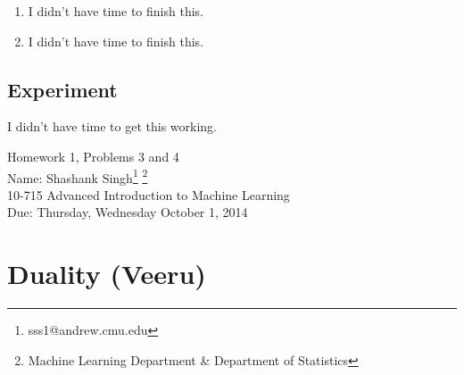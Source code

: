 \documentclass[11pt]{article}
\makeatletter
\newcommand{\myname}{Shashank Singh\footnote{sss1@andrew.cmu.edu}
        \footnote{Machine Learning Department \& Department of Statistics}}
\newcommand{\myclass}{10-715 Advanced Introduction to Machine Learning}
\newcommand{\myhwnum}{1}
\newcommand{\duedate}{Thursday, Wednesday October 1, 2014}
\renewcommand{\qed}{\quad \ensuremath{\blacksquare}}
\newcommand{\inv}{^{-1}}
\newcommand{\R}{\mathbb{R}} %
\makeatother
\begin{document}
\begin{enumerate}
\[            \dots,
            \psi(\alpha_r^{(V)}) - \psi(\alpha_r^{(V)} + x_i^{(V)})\right),
\]
\[c_{\alpha_r}
    = \sum_{i : y_i = r}^n
        \psi^{(1)}\left( \sum_{j = 1}^V \alpha_r^{(j)} + x_i^{(j)} \right)
        - \psi^{(1)}\left( \sum_{j = 1}^V \alpha_r^{(j)} \right),
\]
and $1_V \in \R^V$ denotes the $V$ dimensional column vector of all ones. Since
$D_{\alpha_r}$ is diagonal, $D_{\alpha_r}$ can be represented and inverted in
$\tilde O(V)$ time and space. Thus, we can use the Sherman-Morrison inversion
formula:
\[\left[H\ell_{\alpha_r}(\alpha_r) \right]\inv
    = \left( D_{\alpha_r} + c_{\alpha_r}1_V1_V^T \right)\inv
    = D_{\alpha_r}\inv
        - \frac{D_{\alpha_r}\inv c_{\alpha_r}1_V1_V^TD_{\alpha_r}\inv}
               {1 + c_{\alpha_r}1_V^TD_{\alpha_r}\inv1_V}.
\]
Hence, since the Newton update is
\[\hat\alpha_r \to
    \hat\alpha_r -
    \left[H\ell_{\alpha_r}(\hat\alpha_r) \right]\inv
    \nabla\ell_{\alpha_r}(\hat\alpha_r)
    = \hat\alpha_r -
    \left( D_{\hat\alpha_r}\inv
    - \frac{D_{\hat\alpha_r}\inv c_{\hat\alpha_r}1_V1_V^TD_{\hat\alpha_r}\inv}
           {1 + c_{\hat\alpha_r}1_V^TD_{\hat\alpha_r}\inv1_V} \right)
    \nabla\ell_{\alpha_r}(\hat\alpha_r).
\]
Note that, if the multiplication by $\nabla\ell_{\alpha_r}(\hat\alpha_r)$ is
distributed over the subtraction, as long as $D$ is stored as a $V$ dimensional
vector and all multiplications are performed from right to left, the above
update requires only $8$ vector arithmetic operations on $V$-dimensional
vectors, while storing at most $2$ $V$-dimensional vectors at a time. Hence,
the update can be performed in $\tilde O(V)$ time and space. \qed
\item I didn't have time to finish this. \frownie
\item I didn't have time to finish this. \frownie
\end{enumerate}
\subsection{Experiment}
I didn't have time to get this working. \frownie

\newpage
\setcounter{footnote}{0}
{\Large Homework \myhwnum, Problems 3 and 4} \\
Name: \myname \\
\myclass \\
Due: \duedate

\section{Duality (Veeru)}
\end{document}
